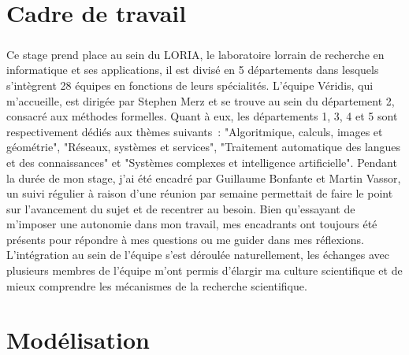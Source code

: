 \documentclass[oneside, a4paper, 11pt]{book}
\begin{document}
\titleformat{\chapter}[display]
	{\normalfont\bfseries}{}{1em}{\Large\hspace{1em}}


\chapter{Cadre de travail}
\paragraph{} 
Ce stage prend place au sein du LORIA, le laboratoire lorrain de recherche en informatique et ses applications, il est divisé en 5 départements dans lesquels s'intègrent 28 équipes en fonctions de leurs spécialités.
L'équipe Véridis, qui m'accueille, est dirigée par Stephen Merz et se trouve au sein du département 2, consacré aux méthodes formelles. Quant à eux, les départements 1, 3, 4 et 5 sont respectivement dédiés aux thèmes suivants~: "Algoritmique, calculs, images et géométrie", "Réseaux, systèmes et services", "Traitement automatique des langues et des connaissances" et "Systèmes complexes et intelligence artificielle".
Pendant la durée de mon stage, j'ai été encadré par Guillaume Bonfante et Martin Vassor, un suivi régulier à raison d'une réunion par semaine permettait de faire le point sur l'avancement du sujet et de recentrer au besoin.
Bien qu'essayant de m'imposer une autonomie dans mon travail, mes encadrants ont toujours été présents pour répondre à mes questions ou me guider dans mes réflexions.
L'intégration au sein de l'équipe s'est déroulée naturellement, les échanges avec plusieurs membres de l'équipe m'ont permis d'élargir ma culture scientifique et de mieux comprendre les mécanismes de la recherche scientifique.



\chapter{Modélisation}
\label{sec:modele}

\end{document}

